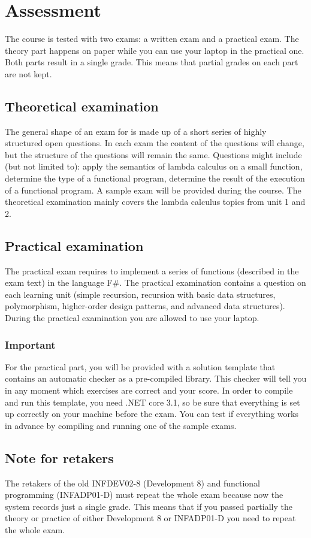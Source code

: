 \section{Assessment}
The course is tested with two exams: a written exam and a practical exam. The theory part happens on paper while you can use your laptop in the practical one. Both parts result in a single grade. This means that partial grades on each part are not kept. 

\subsection{Theoretical examination \modulecode}
The general shape of an exam for \texttt{\modulecode} is made up of a short series of highly structured open questions.
In each exam the content of the questions will change, but the structure of the questions will remain the same. Questions might include (but not limited to): apply the semantics of lambda calculus on a small function, determine the type of a functional program, determine the result of the execution of a functional program. A sample exam will be provided during the course. The theoretical examination mainly covers the lambda calculus topics from unit 1 and 2.

\subsection{Practical examination \modulecode}
The practical exam requires to implement a series of functions (described in the exam text) in the language F\#. The practical examination contains a question on each learning unit (simple recursion, recursion with basic data structures, polymorphism, higher-order design patterns, and advanced data structures). During the practical examination you are allowed to use your laptop.

\subsubsection{Important}
For the practical part, you will be provided with a solution template that contains an automatic checker as a pre-compiled library. This checker will tell you in any moment which exercises are correct and your score. In order to compile and run this template, you need .NET core 3.1, so be sure that everything is set up correctly on your machine before the exam. You can test if everything works in advance by compiling and running one of the sample exams.

\subsection{Note for retakers}
The retakers of the old INFDEV02-8 (Development 8) and functional programming (INFADP01-D) must repeat the whole exam because now the system records just a single grade. This means that if you passed partially the theory or practice of either Development 8 or INFADP01-D you need to repeat the whole exam.
